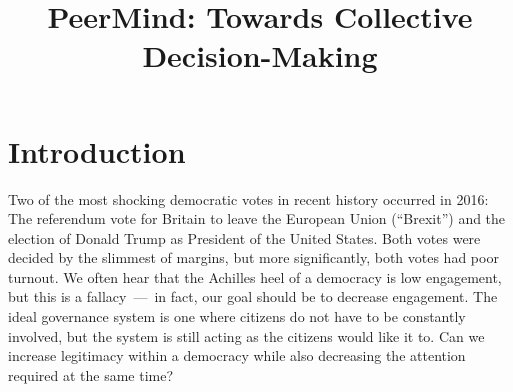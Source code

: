 \documentclass{sigchi}
\begin{document}
\title{PeerMind: Towards Collective Decision-Making}


\maketitle

\begin{abstract}


\end{abstract}



\section{Introduction}

Two of the most shocking democratic votes in recent history occurred in 2016:
The referendum vote for Britain to leave the European Union (``Brexit'') and the election of Donald Trump as
President of the United States.
Both votes were decided by the slimmest of margins, but more significantly, both votes had poor turnout.
We often hear that the Achilles heel of a democracy is low engagement, but this is a fallacy~---~in fact, our goal
should be to decrease engagement.
The ideal governance system is one where citizens do not have to be constantly involved, but the system is still
acting as the citizens would like it to. Can we increase legitimacy within a democracy while also decreasing the
attention required at the same time?
\end{document}

